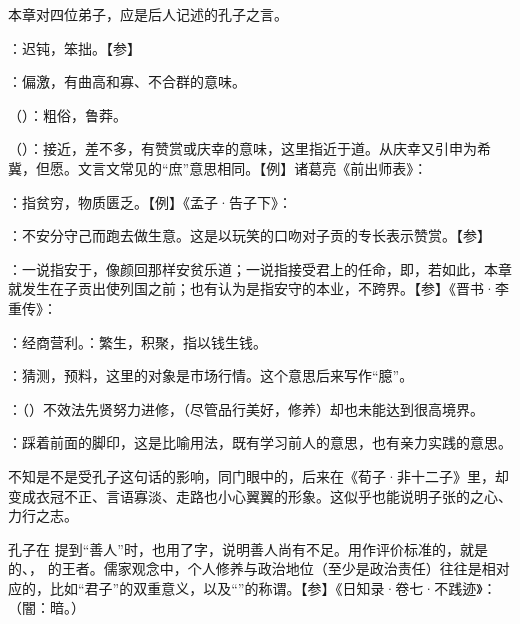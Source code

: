 {
本章对四位弟子，应是后人记述的孔子之言。
\begin{lyitemize}
\item {}：迟钝，笨拙。【参】 
\item {}：偏激，有曲高和寡、不合群的意味。
\item {}（）：粗俗，鲁莽。
\end{lyitemize}
}
{}


{
\item {}（）：接近，差不多，有赞赏或庆幸的意味，这里指近于道。从庆幸又引申为希冀，但愿。文言文常见的“庶”意思相同。【例】诸葛亮《前出师表》：
\item {}：指贫穷，物质匮乏。【例】《孟子·告子下》：
\item {}：不安分守己而跑去做生意。这是以玩笑的口吻对子贡的专长表示赞赏。【参】

：一说指安于，像颜回那样安贫乐道；一说指接受君上的任命，即，若如此，本章就发生在子贡出使列国之前；也有认为是指安守的本业，不跨界。【参】《晋书·李重传》：

：经商营利。：繁生，积聚，指以钱生钱。
\item {}：猜测，预料，这里的对象是市场行情。这个意思后来写作“臆”。
}
{}


{
\begin{lyitemize}
\item {}：（）不效法先贤努力进修，（尽管品行美好，修养）却也未能达到很高境界。

：踩着前面的脚印，这是比喻用法，既有学习前人的意思，也有亲力实践的意思。

不知是不是受孔子这句话的影响，同门眼中的，后来在《荀子·非十二子》里，却变成衣冠不正、言语寡淡、走路也小心翼翼的形象。这似乎也能说明子张的之心、力行之志。
\end{lyitemize}
孔子在   提到“善人”时，也用了字，说明善人尚有不足。用作评价标准的，就是  的、， 的王者。儒家观念中，个人修养与政治地位（至少是政治责任）往往是相对应的，比如“君子”的双重意义，以及“”的称谓。【参】《日知录·卷七·不践迹》：（闇：暗。）
}
{}


